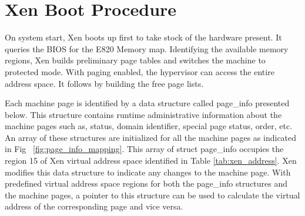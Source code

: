 \section{Xen Boot Procedure}
On system start, Xen boots up first to take stock of the hardware present. It queries the BIOS for the E820 Memory map. Identifying the available memory regions, Xen builds preliminary page tables and switches the machine to protected mode. With paging enabled, the hypervisor can access the entire address space. It follows by building the free page lists.

Each machine page is identified by a data structure called page\_info presented below. This structure contains runtime administrative information about the machine pages such as, status, domain identifier, special page status, order, etc. An array of these structures are initialized for all the machine pages as indicated in Fig ~\ref{fig:page_info_mapping}. This array of struct page\_info occupies the region 15 of Xen virtual address space identified in Table \ref{tab:xen_address}. Xen modifies this data structure to indicate any changes to the machine page. With predefined virtual address space regions for both the page\_info structures and the machine pages, a pointer to this structure can be used to calculate the virtual address of the corresponding page and vice versa. 

